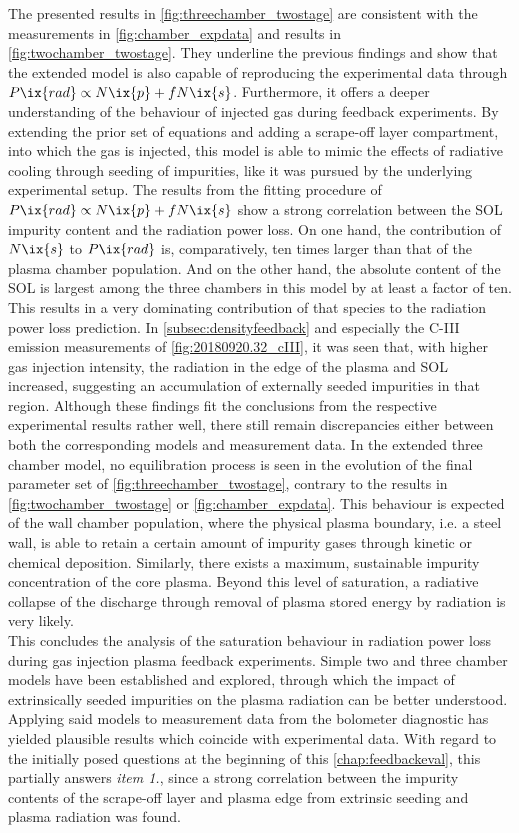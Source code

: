             The presented results in \cref{fig:threechamber_twostage} are consistent with the measurements in \cref{fig:chamber_expdata} and results in \cref{fig:twochamber_twostage}. They underline the previous findings and show that the extended model is also capable of reproducing the experimental data through $P\ix{rad}\propto N\ix{p}+fN\ix{s}$. Furthermore, it offers a deeper understanding of the behaviour of injected gas during feedback experiments. By extending the prior set of equations and adding a scrape-off layer compartment, into which the gas is injected, this model is able to  mimic the effects of radiative cooling through seeding of impurities, like it was pursued by the underlying experimental setup. The results from the fitting procedure of $P\ix{rad}\propto N\ix{p}+fN\ix{s}$ show a strong correlation between the SOL impurity content and the radiation power loss. On one hand, the contribution of $N\ix{s}$ to $P\ix{rad}$ is, comparatively, ten times larger than that of the plasma chamber population. And on the other hand, the absolute content of the SOL is largest among the three chambers in this model by at least a factor of ten. This results in a very dominating contribution of that species to the radiation power loss prediction. In \cref{subsec:densityfeedback} and especially the C-III emission measurements of \cref{fig:20180920.32_cIII}, it was seen that, with higher gas injection intensity, the radiation in the edge of the plasma and SOL increased, suggesting an accumulation of externally seeded impurities in that region. Although these findings fit the conclusions from the respective experimental results rather well, there still remain discrepancies either between both the corresponding models and measurement data. In the extended three chamber model, no equilibration process is seen in the evolution of the final parameter set of \cref{fig:threechamber_twostage}, contrary to the results in \cref{fig:twochamber_twostage} or \cref{fig:chamber_expdata}. This behaviour is expected of the wall chamber population, where the physical plasma boundary, i.e. a steel wall, is able to retain a certain amount of impurity gases through kinetic or chemical deposition\cite{Winter1992}. Similarly, there exists a maximum, sustainable impurity concentration of the core plasma. Beyond this level of saturation, a radiative collapse of the discharge through removal of plasma stored energy by radiation is very likely\cite{Zhang2021_2}.\\%
%
            \newline%
            This concludes the analysis of the saturation behaviour in   radiation power loss during gas injection plasma feedback experiments. Simple two and three chamber models have been established and explored, through which the impact of extrinsically seeded impurities on the plasma radiation can be better understood. Applying said models to measurement data from the bolometer diagnostic has yielded plausible results which coincide with experimental data. With regard to the initially posed questions at the beginning of this \cref{chap:feedbackeval}, this partially answers \textit{item 1.}, since a strong correlation between the impurity contents of the scrape-off layer and plasma edge from extrinsic seeding and plasma radiation was found.%
%
